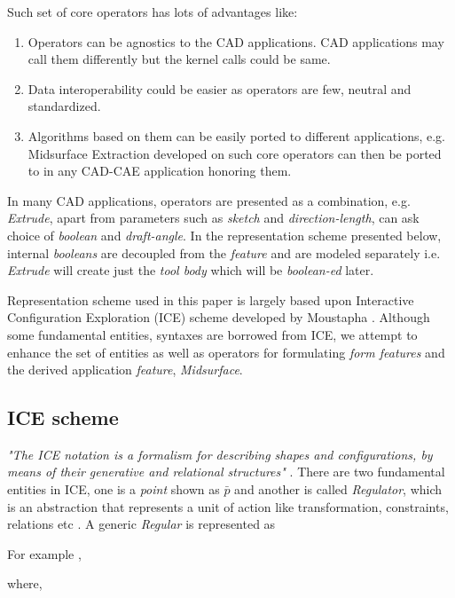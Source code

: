 Such set of core operators has lots of advantages like:
\begin{enumerate}
\item Operators can be agnostics to the CAD applications. CAD applications may call them differently but the kernel calls could be same.
\item Data interoperability could be easier as operators are few, neutral and standardized.
\item Algorithms based on them can be easily ported to different applications, e.g. Midsurface Extraction developed on such core operators can then be ported to in any CAD-CAE application honoring them.
\end{enumerate}

In many CAD applications, operators are presented as a combination, e.g. {\em  Extrude}, apart from parameters such as {\em sketch} and {\em direction-length}, can ask choice of {\em boolean} and {\em draft-angle}. In the representation scheme presented below, internal {\em booleans} are decoupled from the {\em feature} and are modeled separately  i.e. {\em Extrude} will create just the {\em tool body} which will be {\em boolean-ed} later.

Representation scheme used in this paper is largely based upon Interactive Configuration Exploration  (ICE) scheme developed by Moustapha \cite{Hoda2005}. Although some fundamental entities, syntaxes are borrowed from ICE, we attempt to enhance the set of entities as well as operators for formulating {\em form features} and the derived application {\em feature}, {\em Midsurface}.

\subsection{ICE scheme}
{\em "The ICE notation is a formalism for describing shapes and  configurations,  by  means  of  their  generative  and  relational  structures"} \cite{Hoda2005}.  There are two fundamental entities in ICE, one is a {\em point} shown as $\bar{p}$ and another is called {\em Regulator}, which is an abstraction that represents a unit of action like transformation, constraints, relations etc . A generic {\em Regular} is represented as 

{\Large {}}

	 For example ,


	where,


